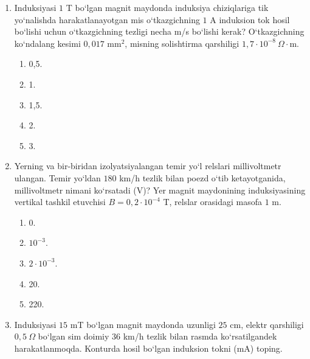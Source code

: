 \begin{enumerate}
\item Induksiyasi $1$ T bo‘lgan magnit maydonda induksiya chiziqlariga tik yo‘nalishda harakatlanayotgan mis o‘tkazgichning $1$ A induksion tok hosil bo‘lishi uchun o‘tkazgichning tezligi necha m/s bo‘lishi kerak? O‘tkazgichning ko‘ndalang kesimi $0,017$ mm$^2$, misning solishtirma qarshiligi $1,7\cdot10^{-8}~\Omega\cdot$m.
\begin{enumerate}[label=\Alph*)]
\item 0,5.
\item 1.
\item 1,5.
\item 2.
\item 3.
\end{enumerate}

\item Yerning va bir-biridan izolyatsiyalangan temir yo‘l relslari millivoltmetr ulangan. Temir yo‘ldan $180$ km/h tezlik bilan poezd o‘tib ketayotganida, millivoltmetr nimani ko‘rsatadi (V)? Yer magnit maydonining induksiyasining vertikal tashkil etuvchisi $B=0,2\cdot10^{-4}$ T, relslar orasidagi masofa $1$ m.

\begin{enumerate}[label=\Alph*)]
\item 0.
\item $10^{-3}$.
\item $2\cdot10^{-3}$.
\item 20.
\item 220.
\end{enumerate}

\item Induksiyasi $15$ mT bo‘lgan magnit maydonda uzunligi $25$ cm, elektr qarshiligi $0,5~\Omega$ bo‘lgan sim doimiy $36$ km/h tezlik bilan rasmda ko‘rsatilgandek harakatlanmoqda. Konturda hosil bo‘lgan induksion tokni (mA) toping.

\end{enumerate}
